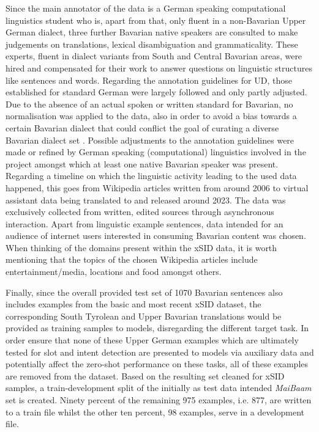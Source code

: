 \documentclass[11pt,a4paper,twoside,openright]{scrbook}
\begin{document}
Since the main annotator of the data is a German speaking computational linguistics student who is, apart from that, only fluent in a non-Bavarian Upper German dialect, three further Bavarian native speakers are consulted to make judgements on translations, lexical disambiguation and grammaticality. These experts, fluent in dialect variants from South and Central Bavarian areas, were hired and compensated for their work to answer questions on linguistic structures like sentences and words. Regarding the annotation guidelines for UD, those established for standard German were largely followed and only partly adjusted. Due to the absence of an actual spoken or written standard for Bavarian, no normalisation was applied to the data, also in order to avoid a bias towards a certain Bavarian dialect that could conflict the goal of curating a diverse Bavarian dialect set \citep{blaschke-etal-2024-maibaam-multi}. Possible adjustments to the annotation guidelines were made or refined by German speaking (computational) linguistics involved in the project amongst which at least one native Bavarian speaker was present. Regarding a timeline on which the linguistic activity leading to the used data happened, this goes from Wikipedia articles written from around 2006 to virtual assistant data being translated to and released around 2023. The data was exclusively collected from written, edited sources through asynchronous interaction. Apart from linguistic example sentences, data intended for an audience of internet users interested in consuming Bavarian content was chosen. When thinking of the domains present within the xSID data, it is worth mentioning that the topics of the chosen Wikipedia articles include entertainment/media, locations and food amongst others.

Finally, since the overall provided test set of 1070 Bavarian sentences also includes examples from the basic and most recent xSID dataset, the corresponding South Tyrolean and Upper Bavarian translations would be provided as training samples to models, disregarding the different target task. In order ensure that none of these Upper German examples which are ultimately tested for slot and intent detection are presented to models via auxiliary data and potentially affect the zero-shot performance on these tasks, all of these examples are removed from the dataset. Based on the resulting set cleaned for xSID samples, a train-development split of the initially as test data intended \textit{MaiBaam} set is created. Ninety percent of the remaining 975 examples, i.e. 877, are written to a train file whilst the other ten percent, 98 examples, serve in a development file. 
\end{document}
